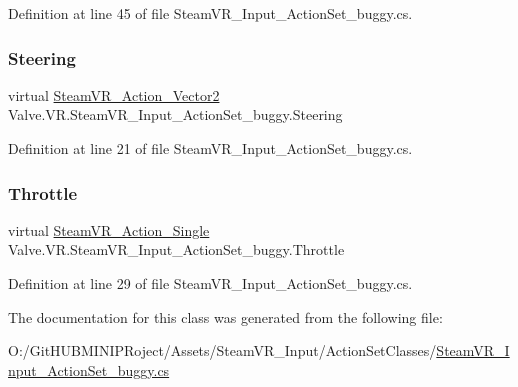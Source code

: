 Definition at line 45 of file Steam\+V\+R\+\_\+\+Input\+\_\+\+Action\+Set\+\_\+buggy.\+cs.

\mbox{\label{class_valve_1_1_v_r_1_1_steam_v_r___input___action_set__buggy_af34f4b348c79d361f6a244d818d04d69}} 
\subsubsection{\texorpdfstring{Steering}{Steering}}
{\footnotesize\ttfamily virtual \mbox{\hyperlink{class_valve_1_1_v_r_1_1_steam_v_r___action___vector2}{Steam\+V\+R\+\_\+\+Action\+\_\+\+Vector2}} Valve.\+V\+R.\+Steam\+V\+R\+\_\+\+Input\+\_\+\+Action\+Set\+\_\+buggy.\+Steering\hspace{0.3cm}{\ttfamily [get]}}



Definition at line 21 of file Steam\+V\+R\+\_\+\+Input\+\_\+\+Action\+Set\+\_\+buggy.\+cs.

\mbox{\label{class_valve_1_1_v_r_1_1_steam_v_r___input___action_set__buggy_a46c6623ba08906f2a12ccb28af62cb47}} 
\subsubsection{\texorpdfstring{Throttle}{Throttle}}
{\footnotesize\ttfamily virtual \mbox{\hyperlink{class_valve_1_1_v_r_1_1_steam_v_r___action___single}{Steam\+V\+R\+\_\+\+Action\+\_\+\+Single}} Valve.\+V\+R.\+Steam\+V\+R\+\_\+\+Input\+\_\+\+Action\+Set\+\_\+buggy.\+Throttle\hspace{0.3cm}{\ttfamily [get]}}



Definition at line 29 of file Steam\+V\+R\+\_\+\+Input\+\_\+\+Action\+Set\+\_\+buggy.\+cs.



The documentation for this class was generated from the following file\+:\begin{DoxyCompactItemize}
\item 
O\+:/\+Git\+H\+U\+B\+M\+I\+N\+I\+P\+Roject/\+Assets/\+Steam\+V\+R\+\_\+\+Input/\+Action\+Set\+Classes/\mbox{\hyperlink{_steam_v_r___input___action_set__buggy_8cs}{Steam\+V\+R\+\_\+\+Input\+\_\+\+Action\+Set\+\_\+buggy.\+cs}}\end{DoxyCompactItemize}
